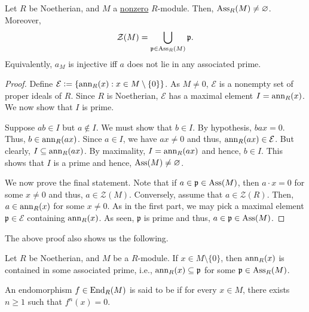 \begin{prop} \label{prop:Ass-is-nonempty}
	Let $R$ be Noetherian, and $M$ a \underline{nonzero} $R$-module. Then, $\operatorname{Ass}_{R}(M) \neq \varnothing$. Moreover,
	\begin{equation*} 
		\mathcal{Z}(M) = \bigcup_{\mathfrak{p} \in \operatorname{Ass}_{R}(M)} \mathfrak{p}.
	\end{equation*}
	Equivalently, $a_{M}$ is injective iff $a$ does not lie in any associated prime.
\end{prop}
\begin{proof} 
	Define $\mathcal{E} \vcentcolon= \{\operatorname{ann}_{R}(x) : x \in M \setminus \{0\}\}$. As $M \neq 0$, $\mathcal{E}$ is a nonempty set of proper ideals of $R$. Since $R$ is Noetherian, $\mathcal{E}$ has a maximal element $I = \operatorname{ann}_{R}(x)$. We now show that $I$ is prime.

	Suppose $ab \in I$ but $a \notin I$. We must show that $b \in I$. By hypothesis, $bax = 0$. Thus, $b \in \operatorname{ann}_{R}(ax)$. Since $a \in I$, we have $ax \neq 0$ and thus, $\operatorname{ann}_{R}(ax) \in \mathcal{E}$. But clearly, $I \subseteq \operatorname{ann}_{R}(ax)$. By maximality, $I = \operatorname{ann}_{R}(ax)$ and hence, $b \in I$. This shows that $I$ is a prime and hence, $\operatorname{Ass}(M) \neq \varnothing$.

	We now prove the final statement. Note that if $a \in \mathfrak{p} \in \operatorname{Ass}(M)$, then $a \cdot x = 0$ for some $x \neq 0$ and thus, $a \in \mathcal{Z}(M)$. \newline
	Conversely, assume that $a \in \mathcal{Z}(R)$. Then, $a \in \operatorname{ann}_{R}(x)$ for some $x \neq 0$. As in the first part, we may pick a maximal element $\mathfrak{p} \in \mathcal{E}$ containing $\operatorname{ann}_{R}(x)$. As seen, $\mathfrak{p}$ is prime and thus, $a \in \mathfrak{p} \in \operatorname{Ass}(M)$.
\end{proof}

The above proof also shows us the following.
\begin{por} \label{por:annihilator-contained-in-associated-prime}
	Let $R$ be Noetherian, and $M$ be a $R$-module. If $x \in M \setminus \{0\}$, then $\operatorname{ann}_{R}(x)$ is contained in some associated prime, i.e., $\operatorname{ann}_{R}(x) \subseteq \mathfrak{p}$ for some $\mathfrak{p} \in \operatorname{Ass}_{R}(M)$.
\end{por}

\begin{defn}
	An endomorphism $f \in \operatorname{End}_{R}(M)$ is said to be  if for every $x \in M$, there exists $n \ge 1$ such that $f^{n}(x) = 0$.
\end{defn}

